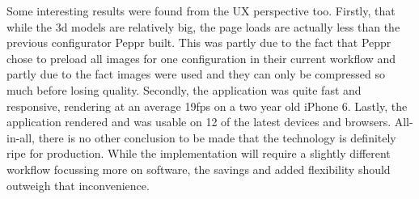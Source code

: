 Some interesting results were found from the UX perspective too. Firstly, that while the 3d models are relatively big, the page loads are actually less than the previous configurator Peppr built. This was partly due to the fact that Peppr chose to preload all images for one configuration in their current workflow and partly due to the fact images were used and they can only be compressed so much before losing quality. Secondly, the application was quite fast and responsive, rendering at an average 19fps on a two year old iPhone 6. Lastly, the application rendered and was usable on 12 of the latest devices and browsers. \newline
All-in-all, there is no other conclusion to be made that the technology is definitely ripe for production. While the implementation will require a slightly different workflow focussing more on software, the savings and added flexibility should outweigh that inconvenience.